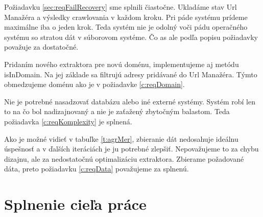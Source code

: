 Požiadavku \ref{sec:reqFailRecovery} sme splnili čiastočne. Ukladáme stav Url Manažéra a výsledky crawlovania v každom kroku. Pri páde systému prídeme maximálne iba o jeden krok. Teda systém nie je odolný voči pádu operačného systému so stratou dát v súborovom systéme. Čo as ale podľa popisu požiadavky považuje za dostatočné. 

Pridaním nového extraktora pre novú doménu, implementujeme aj metódu isInDomain. Na jej základe sa filtrujú adresy pridávané do Url Manažéra. Týmto obmedzujeme doménu ako je v požiadavke \ref{c:reqDomain}.

Nie je potrebné nasadzovať databázu alebo iné externé systémy. Systém robí len to na čo bol nadizajnovaný a nie je zaťažený zbytočným balastom. Teda požiadavka \ref{c:reqKomplexity} je splnená. 

Ako je možné vidieť v tabuľke \ref{t:agrMer}, zbieranie dát nedosahuje ideálnu úspešnosť a v ďalších iteráciách je ju potrebné zlepšiť. Nepovažujeme to za chybu dizajnu, ale za nedostatočnú optimalizáciu extraktora. Zbierame požadované dáta, preto požiadavku \ref{c:reqData} považujeme za splnenú. 

\section{Splnenie cieľa práce}



